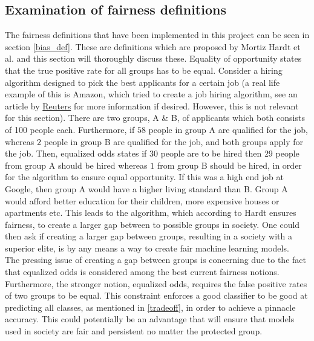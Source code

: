 \documentclass[11pt, fleqn, titlepage]{article}
\begin{document}
	\subsection{Examination of fairness definitions}\label{examination_of_fairness_definitions}
	The fairness definitions that have been implemented in this project can be seen in section \ref{bias_def}. These are definitions which are proposed by Mortiz Hardt et al. and this section will thoroughly discuss these. Equality of opportunity states that the true positive rate for all groups has to be equal. Consider a hiring algorithm designed to pick the best applicants for a certain job (a real life example of this is Amazon, which tried to create a job hiring algorithm, see an article by \href{https://www.reuters.com/article/us-amazon-com-jobs-automation-insight/amazon-scraps-secret-ai-recruiting-tool-that-showed-bias-against-women-idUSKCN1MK08G}{Reuters} for more information if desired. However, this is not relevant for this section). There are two groups, A \& B, of applicants which both consists of 100 people each. Furthermore, if $ 58 $ people in group A are qualified for the job, whereas $ 2 $ people in group B are qualified for the job, and both groups apply for the job. Then, equalized odds states if $ 30 $ people are to be hired then $ 29 $ people from group A should be hired whereas $ 1 $ from group B should be hired, in order for the algorithm to ensure equal opportunity. \cite{towardsdata} If this was a high end job at Google, then group A would have a higher living standard than B. Group A would afford better education for their children, more expensive houses or apartments etc. This leads to the algorithm, which according to Hardt ensures fairness, to create a larger gap between to possible groups in society. One could then ask if creating a larger gap between groups, resulting in a society with a superior elite, is by any means a way to create fair machine learning models. \newline
	\\
	\noindent 
	The pressing issue of creating a gap between groups is concerning due to the fact that equalized odds is considered among the best current fairness notions. Furthermore, the stronger notion, equalized odds, requires the false positive rates of two groups to be equal. This constraint enforces a good classifier to be good at predicting all classes, as mentioned in \ref{tradeoff}, in order to achieve a pinnacle accuracy. This could potentially be an advantage that will ensure that models used in society are fair and persistent no matter the protected group. 
	
\end{document}
